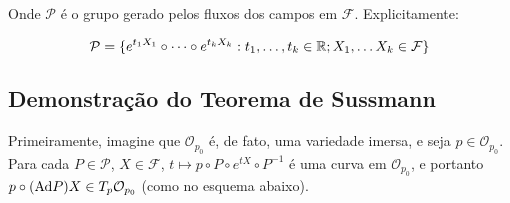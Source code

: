 Onde $\mathcal{P}$ é o grupo gerado pelos fluxos dos campos em $\mathcal{F}$. Explicitamente:

$$\mathcal{P} = \{e^{t_1X_1} \circ \dots \circ e^{t_kX_k}:
t_1, \dots, t_k \in \mathbb{R} ; X_1, \dots X_k \in \mathcal{F}\}$$

\subsection{Demonstração do Teorema de Sussmann}

Primeiramente, imagine que $\mathcal{O}_{p_0}$ é, de fato, uma variedade imersa,
e seja $p \in \mathcal{O}_{p_0}$.
Para cada $P \in \mathcal{P}$, $X \in \mathcal{F}$,
$t \mapsto p \circ P \circ e^{tX} \circ P^{-1}$ é uma curva
em $\mathcal{O}_{p_0}$, e portanto $p \circ (\text{Ad} P) X \in T_p \mathcal{O}_{p_0}$
(como no esquema abaixo).\\



